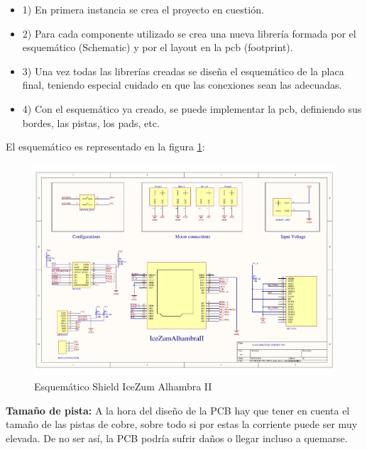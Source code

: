 \begin{itemize}
	\item 1) En primera instancia se crea el proyecto en cuestión.
	\item 2) Para cada componente utilizado se crea una nueva librería formada por el esquemático (Schematic) y por el layout en la pcb (footprint).
	\item 3) Una vez todas las librerías creadas se diseña el esquemático de la placa final, teniendo especial cuidado en que las conexiones sean las adecuadas.
	\item 4) Con el esquemático ya creado, se puede implementar la pcb, definiendo sus bordes, las pistas, los pads, etc.
\end{itemize}

El esquemático es representado en la figura \ref{fig:schematics_tfg}: 
\newpage

\begin{center}
	\begin{figure}[H]
		\center
		\includegraphics[scale=0.6, angle=90]{imagenes/Balancing_Robot/pcb_dron_schematic.pdf}
		\caption{Esquemático Shield IceZum Alhambra II}
		\label{fig:schematics_tfg}
	\end{figure}
\end{center}
\newpage

\textbf{Tamaño de pista: } \newline
A la hora del diseño de la PCB hay que tener en cuenta el tamaño de las pistas de cobre, sobre todo si por estas la corriente puede ser muy elevada. De no ser así, la PCB podría sufrir daños o llegar incluso a quemarse. \newline

